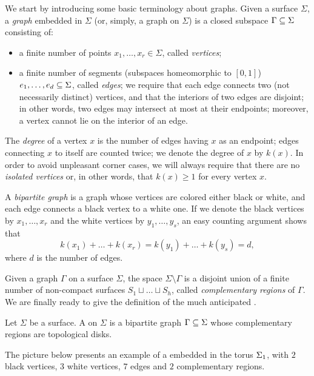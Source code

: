 We start by introducing some basic terminology about graphs. Given a surface $\Sigma$, a \emph{graph} embedded in $\Sigma$ (or, simply, a graph on $\Sigma$) is a closed subspace $\Gamma\subseteq\Sigma$ consisting of:
\begin{itemize}
\item a finite number of points $x_1,\ldots,x_r\in\Sigma$, called \emph{vertices};
\item a finite number of segments (subspaces homeomorphic to $[0,1]$) $e_1,\ldots,e_d\subseteq\Sigma$, called \emph{edges}; we require that each edge connects two (not necessarily distinct) vertices, and that the interiors of two edges are disjoint; in other words, two edges may intersect at most at their endpoints; moreover, a vertex cannot lie on the interior of an edge.
\end{itemize}
The \emph{degree} of a vertex $x$ is the number of edges having $x$ as an endpoint; edges connecting $x$ to itself are counted twice; we denote the degree of $x$ by $k(x)$. In order to avoid unpleasant corner cases, we will always require that there are no \emph{isolated vertices} or, in other words, that $k(x)\ge 1$ for every vertex $x$.

A \emph{bipartite graph} is a graph whose vertices are colored either black or white, and each edge connects a black vertex to a white one. If we denote the black vertices by $x_1,\ldots,x_r$ and the white vertices by $y_1,\ldots,y_s$, an easy counting argument shows that
\[
k(x_1)+\ldots+k(x_r)=k(y_1)+\ldots+k(y_s)=d,
\]
where $d$ is the number of edges.

Given a graph $\Gamma$ on a surface $\Sigma$, the space $\Sigma\setminus\Gamma$ is a disjoint union of a finite number of non-compact surfaces $S_1\sqcup\ldots\sqcup S_h$, called \emph{complementary regions} of $\Gamma$. We are finally ready to give the definition of the much anticipated \dessins{}.

\begin{definition}
Let $\Sigma$ be a surface. A \emph{\dessin{}} on $\Sigma$ is a bipartite graph $\Gamma\subseteq\Sigma$ whose complementary regions are topological disks.
\end{definition}

The picture below presents an example of a \dessin{} embedded in the torus $\Sigma_{1}$, with $2$ black vertices, $3$ white vertices, $7$ edges and $2$ complementary regions.

\begin{center}
\end{center}

